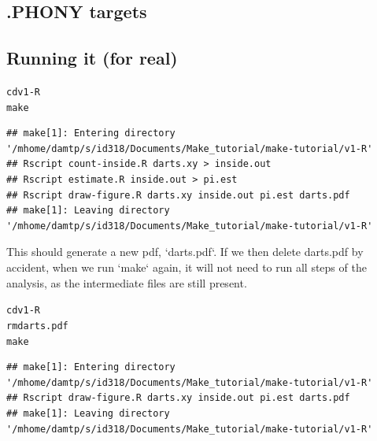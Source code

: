 \documentclass[12pt]{article}\usepackage[]{graphicx}\usepackage[]{color}
\makeatletter
\newenvironment{kframe}{%
 \def\at@end@of@kframe{}%
 \ifinner\ifhmode%
  \def\at@end@of@kframe{\end{minipage}}%
  \begin{minipage}{\columnwidth}%
 \fi\fi%
 \def\FrameCommand##1{\hskip\@totalleftmargin \hskip-\fboxsep
 \colorbox{shadecolor}{##1}\hskip-\fboxsep
     \hskip-\linewidth \hskip-\@totalleftmargin \hskip\columnwidth}%
 \MakeFramed {\advance\hsize-\width
   \@totalleftmargin\z@ \linewidth\hsize
   \@setminipage}}%
 {\par\unskip\endMakeFramed%
 \at@end@of@kframe}
\newenvironment{knitrout}{}{} %
\makeatother
\begin{document}
\subsection{.PHONY targets}


\subsection{Running it (for real)}


\begin{knitrout}
\color{fgcolor}\begin{kframe}
\begin{alltt}
cd v1-R
make
\end{alltt}

\begin{verbatim}
## make[1]: Entering directory '/mhome/damtp/s/id318/Documents/Make_tutorial/make-tutorial/v1-R'
## Rscript count-inside.R darts.xy > inside.out
## Rscript estimate.R inside.out > pi.est
## Rscript draw-figure.R darts.xy inside.out pi.est darts.pdf
## make[1]: Leaving directory '/mhome/damtp/s/id318/Documents/Make_tutorial/make-tutorial/v1-R'
\end{verbatim}
\end{kframe}
\end{knitrout}

This should generate a new pdf, `darts.pdf`.  If we then delete
darts.pdf by accident, when we run `make` again, it will not need to
run all steps of the analysis, as the intermediate files are still
present.


\begin{knitrout}
\color{fgcolor}\begin{kframe}
\begin{alltt}
cd v1-R
rm darts.pdf
make
\end{alltt}

\begin{verbatim}
## make[1]: Entering directory '/mhome/damtp/s/id318/Documents/Make_tutorial/make-tutorial/v1-R'
## Rscript draw-figure.R darts.xy inside.out pi.est darts.pdf
## make[1]: Leaving directory '/mhome/damtp/s/id318/Documents/Make_tutorial/make-tutorial/v1-R'
\end{verbatim}
\end{kframe}
\end{knitrout}
\end{document}
